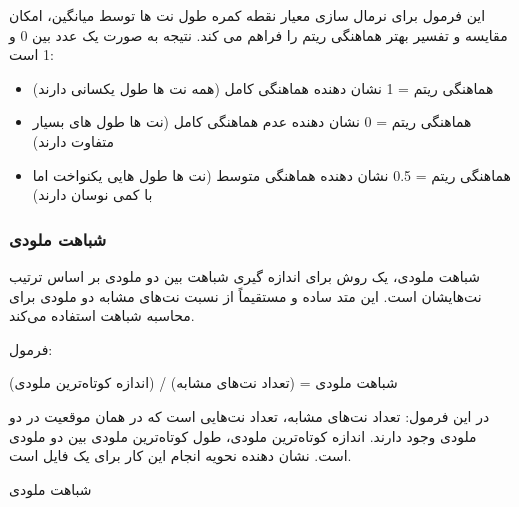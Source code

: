 این فرمول برای نرمال سازی معیار نقطه کمره طول نت ها توسط میانگین، امکان مقایسه و تفسیر بهتر هماهنگی ریتم را فراهم می کند. نتیجه به صورت یک عدد بین 0 و 1 است:

\begin{itemize}
      \item هماهنگی ریتم = 1 نشان دهنده هماهنگی کامل (همه نت ها طول یکسانی دارند)
      \item هماهنگی ریتم = 0 نشان دهنده عدم هماهنگی کامل (نت ها طول های بسیار متفاوت دارند)
      \item هماهنگی ریتم = 0.5 نشان دهنده هماهنگی متوسط (نت ها طول هایی یکنواخت اما با کمی نوسان دارند)
\end{itemize}

\subsubsection{ شباهت ملودی }

شباهت ملودی، یک روش برای اندازه گیری شباهت بین دو ملودی بر اساس ترتیب نت‌هایشان است. این متد ساده و مستقیماً از نسبت نت‌های مشابه دو ملودی برای محاسبه شباهت استفاده می‌کند.

فرمول:

شباهت ملودی = (تعداد نت‌های مشابه) / (اندازه کوتاه‌ترین ملودی)

در این فرمول:
تعداد نت‌های مشابه، تعداد نت‌هایی است که در همان موقعیت در دو ملودی وجود دارند.
اندازه کوتاه‌ترین ملودی، طول کوتاه‌ترین ملودی بین دو ملودی است.
 نشان دهنده نحویه انجام این کار برای یک فایل  است. 

\begin{LTR}
      \begin{algorithm}
            \caption{شباهت ملودی }
            \setmainfont{Times New Roman}
            \label{alg:analyze_melodic_similarity}
            \begin{algorithmic}
            \end{algorithmic}
      \end{algorithm}
\end{LTR}
